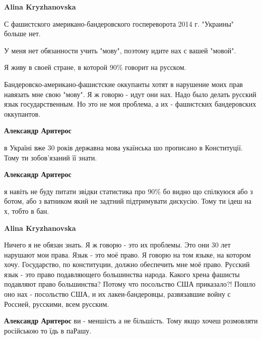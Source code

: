\begin{itemize}
\begin{itemize}
\textbf{Alina Kryzhanovska} 

С фашистского американо-бандеровского госпереворота 2014 г. "Украины" больше
нет.

У меня нет обязанности учить "мову", поэтому идите нах с вашей "мовой".

Я живу в своей стране, в которой 90\% говорит на русском.

Бандеровско-американо-фашистские оккупанты хотят в нарушение моих прав навязать
мне свою "мову". Я ж говорю - идут они нах. Надо было делать русский язык
государственным. Но это не моя проблема, а их - фашистских бандеровских
оккупантов.


\textbf{Александр Аритерос} 

в Україні вже 30 років державна мова укаїнська шо прописано в Конституції. Тому
ти зобов’язаний її знати.



\textbf{Александр Аритерос} 

я навіть не буду питати звідки статистика про 90\%
бо видно що спілкуюся або з ботом, або з ватником який не задтний підтримувати
дискусію. Тому ти ідеш на х, тобто в бан.



\textbf{Alina Kryzhanovska} 

Ничего я не обязан знать. Я ж говорю - это их проблемы. Это они 30 лет нарушают
мои права. Язык - это моё право. Я говорю на том языке, на котором хочу.
Государство, по конституции, должно обеспечить мне моё право. Русский язык -
это право подавляющего большинства народа. Какого хрена фашисты подавляют право
большинства? Потому что посольство США приказало?! Пошло оно нах - посольство
США, и их лакеи-бандеровцы, развязавшие войну с Россией, русскими, всем
русским.


\textbf{Александр Аритерос} 
ви - меншість а не більшість. Тому якщо хочеш розмовляти російською то їдь в паРашу.




\end{itemize}
\end{itemize}

